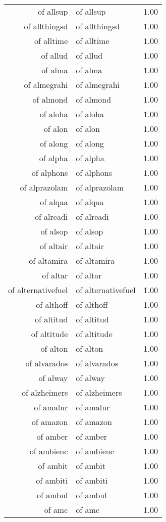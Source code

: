 \begin{table}[ht]
\begin{tabular}{rlr}
  of allsup & of allsup & 1.00 \\ 
  of allthingsd & of allthingsd & 1.00 \\ 
  of alltime & of alltime & 1.00 \\ 
  of allud & of allud & 1.00 \\ 
  of alma & of alma & 1.00 \\ 
  of almegrahi & of almegrahi & 1.00 \\ 
  of almond & of almond & 1.00 \\ 
  of aloha & of aloha & 1.00 \\ 
  of alon & of alon & 1.00 \\ 
  of along & of along & 1.00 \\ 
  of alpha & of alpha & 1.00 \\ 
  of alphons & of alphons & 1.00 \\ 
  of alprazolam & of alprazolam & 1.00 \\ 
  of alqaa & of alqaa & 1.00 \\ 
  of alreadi & of alreadi & 1.00 \\ 
  of alsop & of alsop & 1.00 \\ 
  of altair & of altair & 1.00 \\ 
  of altamira & of altamira & 1.00 \\ 
  of altar & of altar & 1.00 \\ 
  of alternativefuel & of alternativefuel & 1.00 \\ 
  of althoff & of althoff & 1.00 \\ 
  of altitud & of altitud & 1.00 \\ 
  of altitude & of altitude & 1.00 \\ 
  of alton & of alton & 1.00 \\ 
  of alvarados & of alvarados & 1.00 \\ 
  of alway & of alway & 1.00 \\ 
  of alzheimers & of alzheimers & 1.00 \\ 
  of amalur & of amalur & 1.00 \\ 
  of amazon & of amazon & 1.00 \\ 
  of amber & of amber & 1.00 \\ 
  of ambienc & of ambienc & 1.00 \\ 
  of ambit & of ambit & 1.00 \\ 
  of ambiti & of ambiti & 1.00 \\ 
  of ambul & of ambul & 1.00 \\ 
  of amc & of amc & 1.00 \\ 

\end{tabular}
\end{table}
